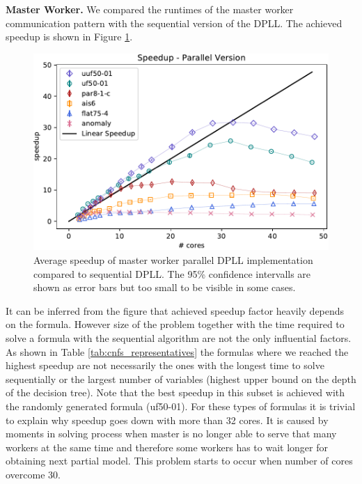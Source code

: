 \documentclass[letterpaper]{article}
\newcommand{\mypar}[1]{{\bf #1.}}
\begin{document}
\mypar{Master Worker}
We compared the runtimes of the master worker communication pattern with the sequential version of the DPLL. The achieved speedup is shown in Figure \ref{fig:dpll_parallel_speedup}.
\begin{figure}
    \centering
    \includegraphics[width=\columnwidth]{figures/scaling_parallel_subset_dpll_scaling_tar.pdf}
    \caption{Average speedup of master worker parallel DPLL implementation compared to sequential DPLL.
    The 95\% confidence intervalls are shown as error bars but too small to be visible in some cases.
    \label{fig:dpll_parallel_speedup}}
\end{figure}
It can be inferred from the figure that achieved speedup factor heavily depends on the formula.
However size of the problem together with the time required to solve a formula with the sequential algorithm are not the only influential factors. 
As shown in Table \ref{tab:cnfs_representatives} the formulas where we reached the highest speedup are not necessarily the ones with the longest time to solve sequentially or the largest number of variables (highest upper bound on the depth of the decision tree).
Note that the best speedup in this subset is achieved with the randomly generated formula (uf50-01).
For these types of formulas it is trivial to explain why speedup goes down with more than 32 cores.
It is caused by moments in solving process when master is no longer able to serve that many workers at the same time and therefore some workers has to wait longer for obtaining next partial model. This problem starts to occur when number of cores overcome 30. 
\end{document}
